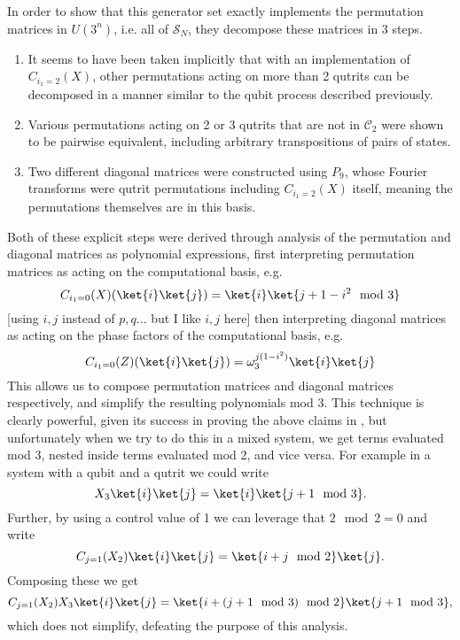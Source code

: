 In order to show that this generator set exactly implements the permutation matrices in $U\left(3^n\right)$, i.e. all of $\mathcal{S}_{N}$, they decompose these matrices in 3 steps.
\begin{enumerate}
	\item It seems to have been taken implicitly that with an implementation of $C_{i_1 = 2}(X)$, other permutations acting on more than 2 qutrits can be decomposed in a manner similar to the qubit process described previously.
	\item Various permutations acting on 2 or 3 qutrits that are not in $\mathcal{C}_2$ were shown to be pairwise equivalent, including arbitrary transpositions of pairs of states.
	\item Two different diagonal matrices were constructed using $P_9$, whose Fourier transforms were qutrit permutations including $C_{i_1=2}(X)$ itself, meaning the permutations themselves are in this basis.
\end{enumerate}

Both of these explicit steps were derived through analysis of the permutation and diagonal matrices as polynomial expressions, first interpreting permutation matrices as acting on the computational basis, e.g.
\[C_{i_1=0}(X)(\ket{i}\ket{j}) = \ket{i}\ket{j+1-i^2 \mod 3}\]
[using $i,j$ instead of $p,q$... but I like $i,j$ here] then interpreting diagonal matrices as acting on the phase factors of the computational basis, e.g.
\[C_{i_1=0}(Z)(\ket{i}\ket{j}) = \omega_{3}^{j(1-i^2)}\ket{i}\ket{j}\]
This allows us to compose permutation matrices and diagonal matrices respectively, and simplify the resulting polynomials mod 3. This technique is clearly powerful, given its success in proving the above claims in \cite{arithmetics}, but unfortunately when we try to do this in a mixed system, we get terms evaluated mod 3, nested inside terms evaluated mod 2, and vice versa. For example in a system with a qubit and a qutrit we could write
\[X_3\ket{i}\ket{j} = \ket{i}\ket{j+1\mod 3}.\]
Further, by using a control value of 1 we can leverage that $2 \mod 2 = 0$ and write
\[C_{j=1}(X_2)\ket{i}\ket{j} = \ket{i+j \mod 2}\ket{j}.\]
Composing these we get
\[C_{j=1}(X_2)X_3\ket{i}\ket{j} = \ket{i+(j+1 \mod 3)\mod 2}\ket{j + 1 \mod 3},\]
which does not simplify, defeating the purpose of this analysis. 

